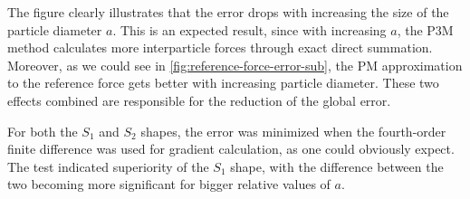 The figure clearly illustrates that the error drops with increasing the size of the particle diameter $a$.
This is an expected result, since with increasing $a$, the P3M method calculates more interparticle forces through exact direct summation.
Moreover, as we could see in \autoref{fig:reference-force-error-sub}, the PM approximation to the reference force gets better with increasing particle diameter.
These two effects combined are responsible for the reduction of the global error.

For both the $S_1$ and $S_2$ shapes, the error was minimized when the fourth-order finite difference was used for gradient calculation, as one could obviously expect.
The test indicated superiority of the $S_1$ shape, with the difference between the two becoming more significant for bigger relative values of $a$.
